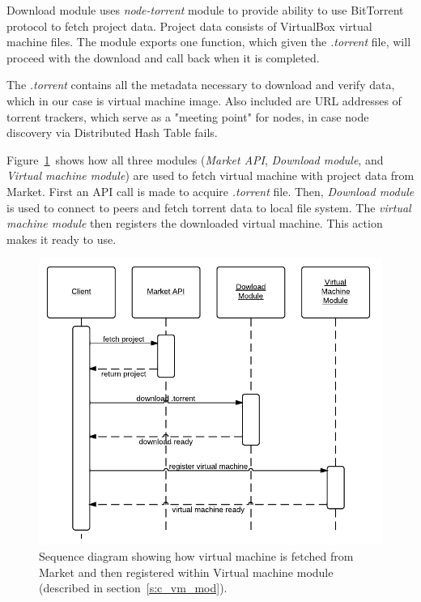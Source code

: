 Download module uses \emph{node-torrent} module to provide ability to use BitTorrent protocol to fetch project data. Project data consists of VirtualBox virtual machine files. The module exports one function, which given the \emph{.torrent} file, will proceed with the download and call back when it is completed.

The \emph{.torrent} contains all the metadata necessary to download and verify data, which in our case is virtual machine image. Also included are URL addresses of torrent trackers, which serve as a "meeting point" for nodes, in case node discovery via Distributed Hash Table fails.

Figure~\ref{f:clientprojdownload}~shows how all three modules (\emph{Market API}, \emph{Download module}, and \emph{Virtual machine module}) are used to fetch virtual machine with project data from Market. First an API call is made to acquire \emph{.torrent} file. Then, \emph{Download module} is used to connect to peers and fetch torrent data to local file system. The \emph{virtual machine module} then registers the downloaded virtual machine. This action makes it ready to use.

\begin{figure}
\centering
\includegraphics{diagrams/ClientProjectDownload.pdf}
\caption{Sequence diagram showing how virtual machine is fetched from Market and then registered within Virtual machine module (described in section~\ref{s:c_vm_mod}).}
\label{f:clientprojdownload}
\end{figure}

